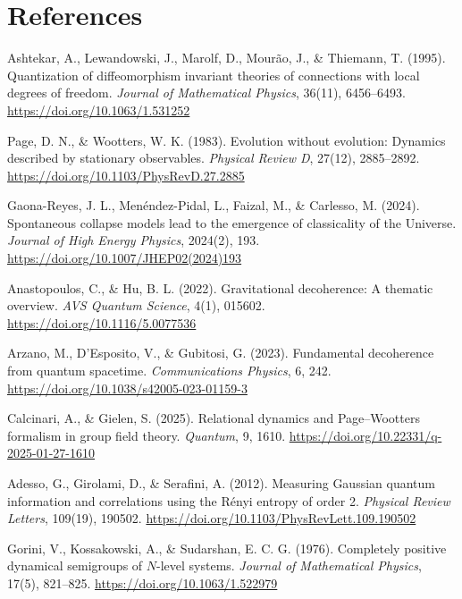 \documentclass[12pt,a4paper]{article}
\numberwithin{equation}{section}
\begin{document}
\section*{\centering References}
\vspace{0.3cm}
\begin{enumerate}[leftmargin=0.5in, itemindent=-0.5in, label={[\arabic*]}]

\item Ashtekar, A., Lewandowski, J., Marolf, D., Mour\~ao, J., \& Thiemann, T. (1995). Quantization of diffeomorphism invariant theories of connections with local degrees of freedom. \textit{Journal of Mathematical Physics}, 36(11), 6456--6493. \url{https://doi.org/10.1063/1.531252}

\item Page, D. N., \& Wootters, W. K. (1983). Evolution without evolution: Dynamics described by stationary observables. \textit{Physical Review D}, 27(12), 2885--2892. \url{https://doi.org/10.1103/PhysRevD.27.2885}

\item Gaona-Reyes, J. L., Men\'endez-Pidal, L., Faizal, M., \& Carlesso, M. (2024). Spontaneous collapse models lead to the emergence of classicality of the Universe. \textit{Journal of High Energy Physics}, 2024(2), 193. \url{https://doi.org/10.1007/JHEP02(2024)193}

\item Anastopoulos, C., \& Hu, B. L. (2022). Gravitational decoherence: A thematic overview. \textit{AVS Quantum Science}, 4(1), 015602. \url{https://doi.org/10.1116/5.0077536}

\item Arzano, M., D'Esposito, V., \& Gubitosi, G. (2023). Fundamental decoherence from quantum spacetime. \textit{Communications Physics}, 6, 242. \url{https://doi.org/10.1038/s42005-023-01159-3}

\item Calcinari, A., \& Gielen, S. (2025). Relational dynamics and Page--Wootters formalism in group field theory. \textit{Quantum}, 9, 1610. \url{https://doi.org/10.22331/q-2025-01-27-1610}

\item Adesso, G., Girolami, D., \& Serafini, A. (2012). Measuring Gaussian quantum information and correlations using the R\'enyi entropy of order 2. \textit{Physical Review Letters}, 109(19), 190502. \url{https://doi.org/10.1103/PhysRevLett.109.190502}

\item Gorini, V., Kossakowski, A., \& Sudarshan, E. C. G. (1976). Completely positive dynamical semigroups of $N$-level systems. \textit{Journal of Mathematical Physics}, 17(5), 821--825. \url{https://doi.org/10.1063/1.522979}


\end{enumerate}
\end{document}

